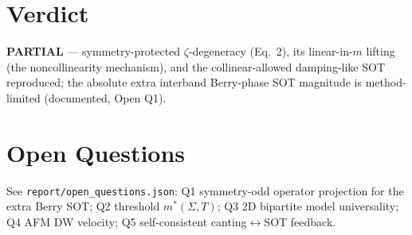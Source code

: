 \documentclass[11pt]{article}
\begin{document}
\section{Verdict}
\textbf{PARTIAL} --- symmetry-protected $\zeta$-degeneracy (Eq.~2), its linear-in-$m$ lifting (the
noncollinearity mechanism), and the collinear-allowed damping-like SOT reproduced; the absolute
extra interband Berry-phase SOT magnitude is method-limited (documented, Open Q1).

\section*{Open Questions}
See \texttt{report/open\_questions.json}: Q1 symmetry-odd operator projection for the extra Berry
SOT; Q2 threshold $m^*(\Sigma,T)$; Q3 2D bipartite model universality; Q4 AFM DW velocity; Q5
self-consistent canting$\leftrightarrow$SOT feedback.
\end{document}
